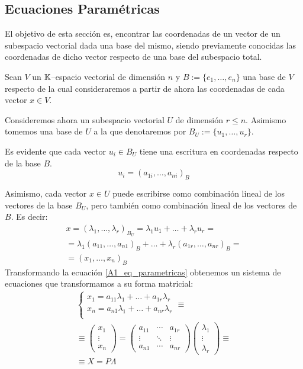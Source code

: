 \subsection{Ecuaciones Paramétricas}
El objetivo de esta sección es, encontrar las coordenadas de un vector de un subespacio vectorial dada una base del mismo, siendo previamente conocidas las coordenadas de dicho vector respecto de una base del subespacio total. 

Sean $V$ un $\mathbb{K}$--espacio vectorial de dimensión $n$ y $B:=\{e_1,\dots,e_n\}$ una base de $V$ respecto de la cual consideraremos a partir de ahora las coordenadas de cada vector $x\in V$.

Consideremos ahora un subespacio vectorial $U$ de dimensión $r\leq n$. Asimismo tomemos una base de $U$ a la que denotaremos por $B_U:=\{u_1,\dots,u_r\}$.

Es evidente que cada vector $u_i\in B_U$ tiene una escritura en coordenadas respecto de la base $B$.
\begin{equation*}
	u_i=(a_{1i},\dots,a_{ni})_B
\end{equation*}

Asimismo, cada vector $x\in U$ puede escribirse como combinación lineal de los vectores de la base $B_U$, pero también como combinación lineal de los vectores de $B$. Es decir:
\begin{gather}
	x=(\lambda_1,\dots,\lambda_r)_{B_{U}}=\lambda_1u_1+\dots+\lambda_ru_r=\nonumber\\
	=\lambda_1(a_{11},\dots,a_{n1})_{B}+\dots+\lambda_r(a_{1r},\dots,a_{nr})_{B}=\nonumber\\
	\label{A1_eq_parametricas}=(x_1,\dots,x_n)_{B}
\end{gather}
Transformando la ecuación \ref{A1_eq_parametricas} obtenemos un sistema de ecuaciones que transformamos a su forma matricial:
\begin{gather}
	\begin{cases}
		x_1 = a_{11}\lambda_1+\dots+a_{1r}\lambda_r\\
		x_n = a_{n1}\lambda_1+\dots+a_{nr}\lambda_r\\
	\end{cases}\equiv\nonumber\\\equiv
	\begin{pmatrix}
	x_1\\
	\vdots\\
	x_n
	\end{pmatrix}
	=\begin{pmatrix}
	a_{11} & \cdots & a_{1r}\\
	\vdots & \ddots & \vdots\\
	a_{n1} & \cdots & a_{nr} 
	\end{pmatrix}\begin{pmatrix}
	\lambda_1\\
	\vdots\\
	\lambda_r
	\end{pmatrix}\equiv\nonumber\\
	\label{A1_eq_formaPedante}
	\equiv X=P\Lambda
\end{gather}

